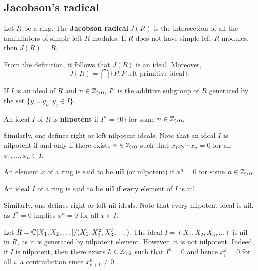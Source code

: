 \section{}
\label{04}


\subsection{Jacobson's radical}

\begin{definition}
Let $R$ be a ring. The \textbf{Jacobson radical} $J(R)$
is the intersection of all the annihilators of simple left $R$-modules. If $R$ does not
have simple left $R$-modules, then $J(R)=R$. 
\end{definition}

From the definition, it follows
that $J(R)$ is an ideal. Moreover, 
	\[
		J(R)=\bigcap\{P:\text{$P$ left primitive ideal}\}.
	\]

	If $I$ is an ideal of $R$ and $n\in\mathbb{Z}_{>0}$, $I^n$ is the additive subgroup of $R$ 
generated by the set $\{y_1\dots y_n:y_j\in I\}$. 

\begin{definition}
An ideal $I$ of $R$ is \textbf{nilpotent} 
if $I^n=\{0\}$ for some $n\in\mathbb{Z}_{>0}$.
\end{definition}

Similarly, one defines right or left nilpotent ideals. 
Note that an ideal $I$ is nilpotent if and only if there exists $n\in\mathbb{Z}_{>0}$ such that 
$x_1x_2\cdots x_n=0$ for all $x_1,\dots,x_n\in I$.  

\begin{definition}
	An element $x$ of a ring is said to be \textbf{nil} (or nilpotent) if $x^n=0$ for some $n\in\mathbb{Z}_{>0}$. 
\end{definition}

\begin{definition}
An ideal $I$ of a ring is said to be \textbf{nil} if every element of $I$ is nil. 
\end{definition}

Similarly, one defines right or left nil ideals. 
Note that every nilpotent ideal is nil, as $I^n=0$ implies $x^n=0$ for all 
$x\in I$.

\begin{example}
	Let $R=\mathbb{C}[X_1,X_2,\dots]/(X_1,X_2^2,X_3^3,\dots)$. The ideal 
	$I=(X_1,X_2,X_3,\dots)$ is nil in $R$, as it is generated by nilpotent element. However, it is not nilpotent. Indeed, if $I$ is nilpotent, then there exists $k\in\mathbb{Z}_{>0}$ such that 
	$I^k=0$ and hence $x_i^k=0$ for all $i$, a contradiction since 
	$x_{k+1}^k\ne0$. 	
\end{example}

